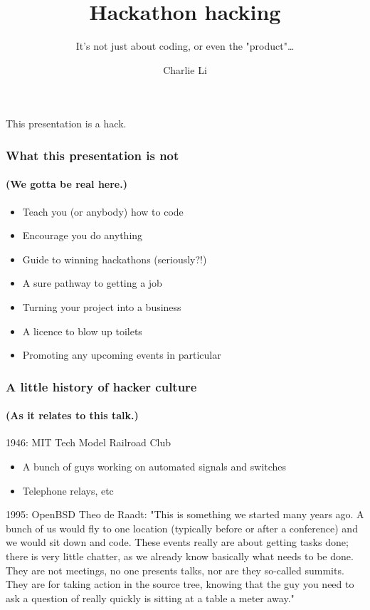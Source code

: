 \documentclass{beamer}
\title{Hackathon hacking}
\subtitle{It's not just about coding, or even the "product"\ldots}
\author{Charlie Li}
\begin{document}
\frame{\titlepage}

\begin{frame}
\pause
\begin{center}
{\Huge This presentation is a hack.}
\end{center}
\end{frame}

\begin{frame}
\frametitle{What this presentation is not}
\framesubtitle{(We gotta be real here.)}

\begin{itemize}
\item Teach you (or anybody) how to code
\pause
\item Encourage you do anything
\pause
\item Guide to winning hackathons (seriously?!)
\pause
\item A sure pathway to getting a job
\pause
\item Turning your project into a business
\pause
\item A licence to blow up toilets
\pause
\item Promoting any upcoming events in particular
\end{itemize}
\end{frame}

\begin{frame}
\frametitle{A little history of hacker culture}
\framesubtitle{(As it relates to this talk.)}
\pause
\begin{block}{1946: MIT Tech Model Railroad Club}
\begin{itemize}
\item A bunch of guys working on automated signals and switches
\item Telephone relays, etc
\end{itemize}
\end{block}
\pause
\begin{block}{1995: OpenBSD}
Theo de Raadt: "This is something we started many years ago. A bunch of us would fly to one location (typically before or after a conference) and we would sit down and code. These events really are about getting tasks done; there is very little chatter, as we already know basically what needs to be done. They are not meetings, no one presents talks, nor are they so-called summits. They are for taking action in the source tree, knowing that the guy you need to ask a question of really quickly is sitting at a table a meter away."
\end{block}
\end{frame}
\end{document}
